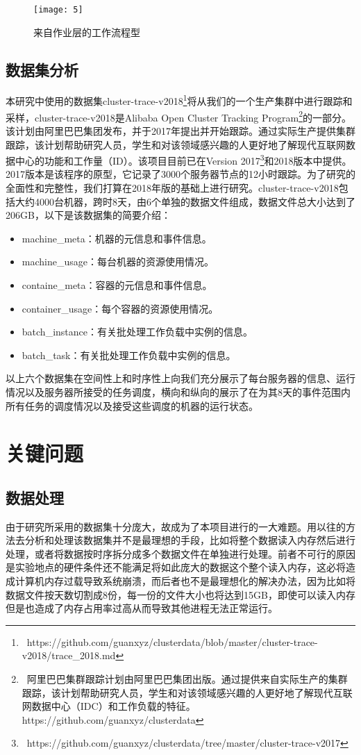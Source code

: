 \begin{figure}[htbp]
	\centering
	\texttt{[image: 5]}
	\caption{来自作业层的工作流程型}
	\label{fig-2}
\end{figure}
\subsection{数据集分析}
本研究中使用的数据集cluster-trace-v2018\footnote{\ https://github.com/guanxyz/clusterdata/blob/master/cluster-trace-v2018/trace\_2018.md}将从我们的一个生产集群中进行跟踪和采样，cluster-trace-v2018是Alibaba Open Cluster Tracking Program\footnote{\ 阿里巴巴集群跟踪计划由阿里巴巴集团出版。通过提供来自实际生产的集群跟踪，该计划帮助研究人员，学生和对该领域感兴趣的人更好地了解现代互联网数据中心（IDC）和工作负载的特征。https://github.com/guanxyz/clusterdata}的一部分。该计划由阿里巴巴集团发布，并于2017年提出并开始跟踪。通过实际生产提供集群跟踪，该计划帮助研究人员，学生和对该领域感兴趣的人更好地了解现代互联网数据中心的功能和工作量（ID）。该项目目前已在Version 2017\footnote{\ https://github.com/guanxyz/clusterdata/tree/master/cluster-trace-v2017}和2018版本中提供。 2017版本是该程序的原型，它记录了3000个服务器节点的12小时跟踪。为了研究的全面性和完整性，我们打算在2018年版的基础上进行研究。cluster-trace-v2018包括大约4000台机器，跨时8天，由6个单独的数据文件组成，数据文件总大小达到了206GB，以下是该数据集的简要介绍：
\begin{itemize}
	\item machine\_meta：机器的元信息和事件信息。
	\item machine\_usage：每台机器的资源使用情况。
	\item containe\_meta：容器的元信息和事件信息。
	\item container\_usage：每个容器的资源使用情况。
	\item batch\_instance：有关批处理工作负载中实例的信息。
	\item batch\_task：有关批处理工作负载中实例的信息。
\end{itemize}

以上六个数据集在空间性上和时序性上向我们充分展示了每台服务器的信息、运行情况以及服务器所接受的任务调度，横向和纵向的展示了在为其8天的事件范围内所有任务的调度情况以及接受这些调度的机器的运行状态。
\section{关键问题}
\subsection{数据处理}
由于研究所采用的数据集十分庞大，故成为了本项目进行的一大难题。用以往的方法去分析和处理该数据集并不是最理想的手段，比如将整个数据读入内存然后进行处理，或者将数据按时序拆分成多个数据文件在单独进行处理。前者不可行的原因是实验地点的硬件条件还不能满足将如此庞大的数据这个整个读入内存，这必将造成计算机内存过载导致系统崩溃，而后者也不是最理想化的解决办法，因为比如将数据文件按天数切割成8份，每一份的文件大小也将达到15GB，即使可以读入内存但是也造成了内存占用率过高从而导致其他进程无法正常运行。

